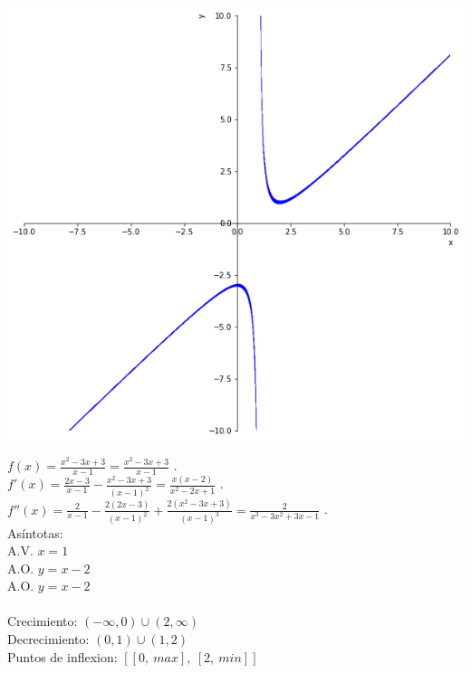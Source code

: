 \documentclass[addpoints,spanish, 12pt,a4paper]{exam}
\begin{document}
\begin{questions}

\begin{solution}
\includegraphics[scale=0.3]{pa2_1}

$f(x)=\frac{x^{2} - 3 x + 3}{x - 1}=\frac{x^{2} - 3 x + 3}{x - 1}$ . \\ $f'(x)=\frac{2 x - 3}{x - 1} - \frac{x^{2} - 3 x + 3}{\left(x - 1\right)^{2}}=\frac{x \left(x - 2\right)}{x^{2} - 2 x + 1}$ . \\ $f''(x)=\frac{2}{x - 1} - \frac{2 \left(2 x - 3\right)}{\left(x - 1\right)^{2}} + \frac{2 \left(x^{2} - 3 x + 3\right)}{\left(x - 1\right)^{3}}=\frac{2}{x^{3} - 3 x^{2} + 3 x - 1}$ . \\ Asíntotas:\\A.V. $x=1$\\A.O. $y=x - 2$ \\A.O. $y=x - 2$ \\ \\ Crecimiento: $\left(-\infty, 0\right) \cup \left(2, \infty\right)$ \\ Decrecimiento: $\left(0, 1\right) \cup \left(1, 2\right) $\\ Puntos de inflexion: $\left[ \left[ 0, \  max\right], \  \left[ 2, \  min\right]\right]$ \\ 




\end{solution}
\end{questions}
\end{document}
